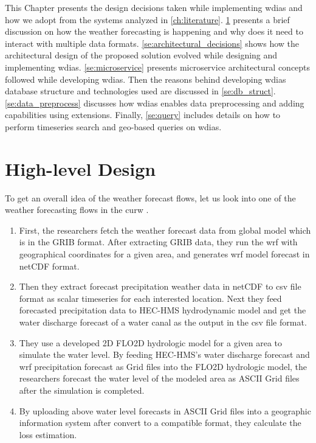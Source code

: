 This Chapter presents the design decisions taken while implementing \acrfull{wdias} and how we adopt from the systems analyzed in \cref{ch:literature}.
\cref{se:high_level_design} presents a brief discussion on how  the weather forecasting is happening and why does it need to interact with multiple data formats.
\cref{se:architectural_decisions} shows how the architectural design of the proposed solution evolved while designing and implementing \acrshort{wdias}.
\cref{se:microservice} presents microservice architectural concepts followed while developing \acrshort{wdias}. Then the reasons behind developing \acrshort{wdias} database structure and technologies used are discussed in  \cref{se:db_struct}.
\cref{se:data_preprocess} discusses how \acrshort{wdias} enables data preprocessing and adding capabilities using extensions. Finally, \cref{se:query} includes details on how to perform timeseries search and geo-based queries on \acrshort{wdias}.


\section{High-level Design}
\label{se:high_level_design}

To get an overall idea of the weather forecast flows, let us look into one of the weather forecasting flows in the \acrshort{curw} \cite{CUrWSL2017Lanka}.

\begin{enumerate}
    \item First, the researchers fetch the weather forecast data from global model which is in the \acrshort{GRIB} format. After extracting \acrshort{GRIB} data, they run the \acrshort{wrf} with geographical coordinates for a given area, and generates \acrshort{wrf} model forecast in \acrshort{netCDF} format.
    \item Then they extract forecast precipitation weather data in \acrshort{netCDF} to \acrshort{csv} file format as scalar timeseries for each interested location. Next they feed forecasted precipitation data to HEC-HMS hydrodynamic model and get the water discharge forecast of a water canal as the output in the \acrshort{csv} file format.
    \item They use a developed 2D FLO2D hydrologic model for a given area to simulate the water level. By feeding HEC-HMS's water discharge forecast and \acrshort{wrf} precipitation forecast as Grid files into the FLO2D hydrologic model, the researchers forecast the water level of the modeled area as ASCII Grid files after the simulation is completed.
    \item By uploading above water level forecasts in ASCII Grid files into a geographic information system after convert to a compatible format, they calculate the loss estimation.
\end{enumerate}


